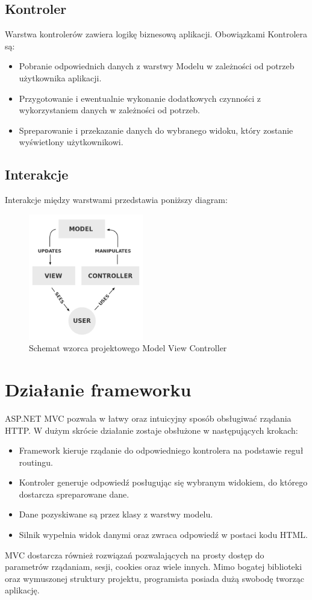 \subsection{Kontroler}
Warstwa kontrolerów zawiera logikę biznesową aplikacji. Obowiązkami Kontrolera są:
\begin{itemize}
\item Pobranie odpowiednich danych z warstwy Modelu w zależności od potrzeb użytkownika aplikacji.
\item Przygotowanie i ewentualnie wykonanie dodatkowych czynności z wykorzystaniem danych w zależności od potrzeb.
\item Spreparowanie i przekazanie danych do wybranego widoku, który zostanie wyświetlony użytkownikowi. 
\end{itemize}

\subsection{Interakcje}
Interakcje między warstwami przedstawia poniższy diagram:
\begin{figure}[h]
	\includegraphics[height=55mm]{./img/mvc.png}
	\caption{Schemat wzorca projektowego Model View Controller}
	\label{fig:mvc-scheme}
\end{figure}


\section{Działanie frameworku}
ASP.NET MVC pozwala w łatwy oraz intuicyjny sposób obsługiwać rządania HTTP. W dużym skrócie działanie zostaje obsłużone w następujących krokach:
\begin{itemize}
\item Framework kieruje rządanie do odpowiedniego kontrolera na podstawie reguł routingu.
\item Kontroler generuje odpowiedź posługując się wybranym widokiem, do którego dostarcza spreparowane dane.
\item Dane pozyskiwane są przez klasy z warstwy modelu.
\item Silnik wypełnia widok danymi oraz zwraca odpowiedź w postaci kodu HTML.
\end{itemize}
MVC dostarcza również rozwiązań pozwalających na prosty dostęp do parametrów rządaniam, sesji, cookies oraz wiele innych. Mimo bogatej biblioteki oraz wymuszonej struktury projektu, programista posiada dużą swobodę tworząc aplikację.

